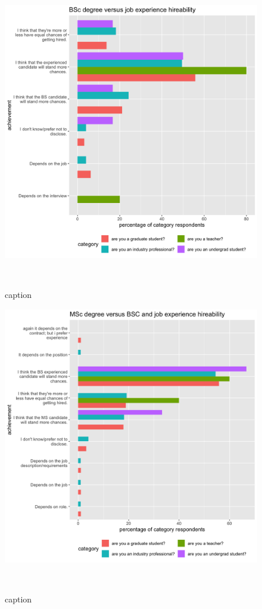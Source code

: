 \documentclass{sigchi}
\begin{document}
\begin{figure}
 \includegraphics[scale=0.2]{../data-analysis/plots_output/BSc_degree_versus_job_experience_hireability.png}
  \caption{caption}~\label{fig:figure6}
\end{figure}

\begin{figure}
 \includegraphics[scale=0.2]{../data-analysis/plots_output/MSc_degree_versus_BSC_and_job_experience_hireability.png}
  \caption{caption}~\label{fig:figure7}
\end{figure}
\end{document}
